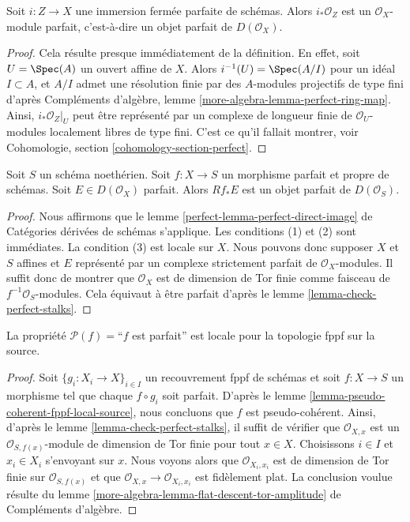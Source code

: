 \begin{lemma}
\label{lemma-perfect-closed-immersion-perfect-direct-image}
Soit $i : Z \to X$ une immersion fermée parfaite de schémas.
Alors $i_*\mathcal{O}_Z$ est un $\mathcal{O}_X$-module parfait, c'est-à-dire
un objet parfait de $D(\mathcal{O}_X)$.
\end{lemma}

\begin{proof}
Cela résulte presque immédiatement de la définition. En effet, soit
$U = \Spec(A)$ un ouvert affine de $X$. Alors $i^{-1}(U) = \Spec(A/I)$
pour un idéal $I \subset A$, et $A/I$ admet une résolution finie par des
$A$-modules projectifs de type fini d'après
Compléments d'algèbre, lemme \ref{more-algebra-lemma-perfect-ring-map}.
Ainsi, $i_*\mathcal{O}_Z|_U$ peut être représenté par un complexe de longueur
finie de $\mathcal{O}_U$-modules localement libres de type fini.
C'est ce qu'il fallait montrer, voir
Cohomologie, section \ref{cohomology-section-perfect}.
\end{proof}

\begin{lemma}
\label{lemma-perfect-proper-perfect-direct-image}
Soit $S$ un schéma noethérien. Soit $f : X \to S$ un morphisme parfait et propre
de schémas. Soit $E \in D(\mathcal{O}_X)$ parfait. Alors
$Rf_*E$ est un objet parfait de $D(\mathcal{O}_S)$.
\end{lemma}

\begin{proof}
Nous affirmons que le lemme
\ref{perfect-lemma-perfect-direct-image} de Catégories dérivées de schémas s'applique.
Les conditions (1) et (2) sont immédiates. La condition (3) est locale
sur $X$. Nous pouvons donc supposer $X$ et $S$ affines et $E$
représenté par un complexe strictement parfait de $\mathcal{O}_X$-modules.
Il suffit donc de montrer que $\mathcal{O}_X$ est de dimension de Tor finie
comme faisceau de $f^{-1}\mathcal{O}_S$-modules.
Cela équivaut à être parfait d'après le
lemme \ref{lemma-check-perfect-stalks}.
\end{proof}

\begin{lemma}
\label{lemma-perfect-fppf-local-source}
La propriété $\mathcal{P}(f) =$``$f$ est parfait''
est locale pour la topologie fppf sur la source.
\end{lemma}

\begin{proof}
Soit $\{g_i : X_i \to X\}_{i \in I}$ un recouvrement fppf de schémas et soit
$f : X \to S$ un morphisme tel que chaque $f \circ g_i$ soit
parfait. D'après le
lemme \ref{lemma-pseudo-coherent-fppf-local-source},
nous concluons que $f$ est pseudo-cohérent.
Ainsi, d'après le
lemme \ref{lemma-check-perfect-stalks},
il suffit de vérifier que $\mathcal{O}_{X, x}$ est un
$\mathcal{O}_{S, f(x)}$-module de dimension de Tor finie pour tout $x \in X$.
Choisissons $i \in I$ et $x_i \in X_i$ s'envoyant sur $x$. Nous voyons alors que
$\mathcal{O}_{X_i, x_i}$ est de dimension de Tor finie sur
$\mathcal{O}_{S, f(x)}$ et que
$\mathcal{O}_{X, x} \to \mathcal{O}_{X_i, x_i}$ est fidèlement plat.
La conclusion voulue résulte du
lemme \ref{more-algebra-lemma-flat-descent-tor-amplitude} de Compléments d'algèbre.
\end{proof}

